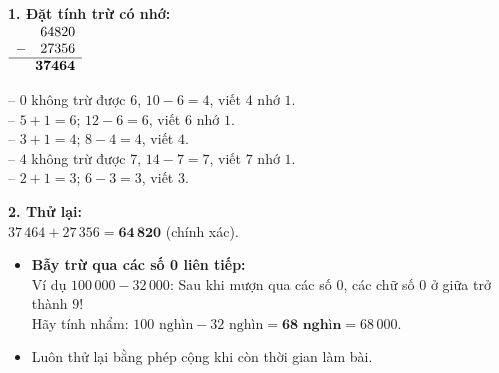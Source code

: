\documentclass[11pt,a4paper]{article}
\begin{document}
\vspace{-2.5mm}
\noindent
\begin{minipage}[t]{0.49\textwidth}\vspace{0pt}
\begin{tcolorbox}[
  enhanced,
  colback=green!4!white,
  colframe=green!60!black,
  arc=2mm, boxrule=0.8pt,
  left=2mm, right=2mm, top=1.8mm, bottom=1.8mm,
  title={\footnotesize\bfseries\color{white}\faCheckCircle\ Ví dụ thực hành chuẩn mực}
]
{\footnotesize
\textbf{1. Đặt tính trừ có nhớ:}\\
$\begin{array}{r@{}l}
  64820 & \\
  -\quad 27356 & \\
  \hline
  \mathbf{37464} &
\end{array}$
\qquad
\begin{minipage}[c]{0.5\linewidth}
-- $0$ không trừ được $6$, $10 - 6 = 4$, viết $4$ nhớ $1$.\\
-- $5 + 1 = 6$; $12 - 6 = 6$, viết $6$ nhớ $1$.\\
-- $3 + 1 = 4$; $8 - 4 = 4$, viết $4$.\\
-- $4$ không trừ được $7$, $14 - 7 = 7$, viết $7$ nhớ $1$.\\
-- $2 + 1 = 3$; $6 - 3 = 3$, viết $3$.
\end{minipage}

\textbf{2. Thử lại:}\\
$37\,464 + 27\,356 = \mathbf{64\,820}$ (chính xác).
}
\end{tcolorbox}
\end{minipage}
\hfill
\begin{minipage}[t]{0.49\textwidth}\vspace{0pt}
\begin{tcolorbox}[
  enhanced,
  colback=red!4!white,
  colframe=red!70!black,
  arc=2mm, boxrule=0.8pt,
  left=2mm, right=2mm, top=1.8mm, bottom=1.8mm,
  title={\footnotesize\bfseries\color{white}\faExclamationTriangle\ Mẹo tránh bẫy trắc nghiệm}
]
{\footnotesize
\begin{itemize}\setlength{\itemsep}{1.5pt}\setlength{\leftskip}{-2.5mm}
  \item \textbf{Bẫy trừ qua các số 0 liên tiếp:}\\
  Ví dụ $100\,000 - 32\,000$: Sau khi mượn qua các số $0$, các chữ số $0$ ở giữa trở thành $9$!\\
  Hãy tính nhẩm: $100\text{ nghìn} - 32\text{ nghìn} = \mathbf{68\text{ nghìn}} = 68\,000$.
  \item Luôn thử lại bằng phép cộng khi còn thời gian làm bài.
\end{itemize}
}
\end{tcolorbox}
\end{minipage}
\end{document}

